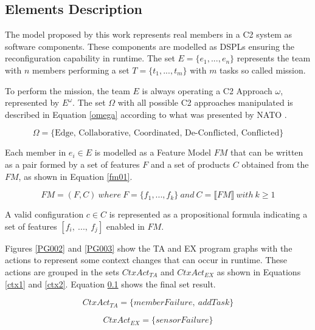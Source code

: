  
 
 \subsection{Elements Description}
 
 The model proposed by this work represents real members in a C2 system as software components. These components are modelled as DSPLs ensuring the reconfiguration capability in runtime. The set $E=\{ e_1, ..., e_n \}$ represents the team with $n$ members performing a set $T=\{t_1, ..., t_m \}$ with $m$ tasks so called mission.
 
To perform the mission, the team $E$ is always operating a C2 Approach $\omega$, represented by $E^\omega$. The set $\Omega$ with all possible C2 approaches manipulated is described in Equation \ref{omega} according to what was presented by NATO \cite{nato01}.

\begin{equation}
    \label{omega}
    \Omega = \text{\{Edge, Collaborative, Coordinated, De-Conflicted, Conflicted\}}
\end{equation}
 
Each member in $e_i \in E$ is modelled as a Feature Model $FM$ that can be written as a pair formed by a set of features $F$ and a set of products $C$ obtained from the $FM$, as shown in Equation \ref{fm01}.

\begin{equation}
    \label{fm01}
    FM=(F,C)\ where\ F=\{f_1,...,f_k\}\ and\ C=\llbracket FM \rrbracket \ with\ k \geq 1
\end{equation}

A valid configuration $c \in C$ is represented as a propositional formula indicating a set of features $[f_i,\ ...,\ f_j]$ enabled in $FM$.

Figures \ref{PG002} and \ref{PG003} show the TA and EX program graphs with the actions to represent some context changes that can occur in runtime. These actions are grouped in the sets $CtxAct_{TA}$ and $CtxAct_{EX}$ as shown in Equations \ref{ctx1} and \ref{ctx2}. Equation \ref{} shows the final set result. 

\begin{equation}
    \label{ctx1}
    CtxAct_{TA}=\{memberFailure,\ addTask \}
\end{equation}

\begin{equation}
    \label{ctx2}
    CtxAct_{EX}=\{sensorFailure \}
\end{equation}

